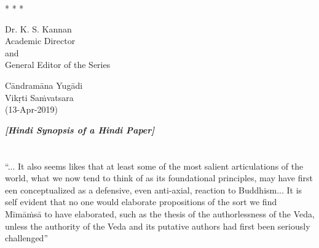 \vskip 3pt

\begin{center}
* * *
\end{center}

\vskip 3pt

\begin{flushright}
Dr. K. S. Kannan\\ Academic Director\\ and\\ General Editor of the Series
\end{flushright}

Cāndramāna Yugādi\\ Vikṛti Saṁvatsara\\ (13-Apr-2019)

\begin{center}
\textbf{\textit{[Hindi Synopsis of a Hindi Paper]}}
\end{center}

\section*{}




\begin{myquote}
“... It also seems likes that at least some of the most salient articulations of the world, what we now tend to think of as its foundational principles, may have first een conceptualized as a defensive, even anti-axial, reaction to Buddhism... It is self evident that no one would elaborate propositions of the sort we find Mīmāṁsā to have elaborated, such as the thesis of the authorlessness of the Veda, unless the authority of the Veda and its putative authors had first been seriously challenged”
\end{myquote}

